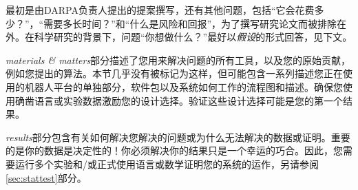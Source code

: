 
最初是由DARPA负责人提出的提案撰写，还有其他问题，包括“它会花费多少？”，“需要多长时间？”和“什么是风险和回报”，为了撰写研究论文而被排除在外。在科学研究的背景下，问题“你想做什么？”最好以\emph{假设}的形式回答，见下文。

\emph{materials \& matters}部分描述了您用来解决问题的所有工具，以及您的原始贡献，例如您提出的算法。本节几乎没有被标记为这样，但可能包含一系列描述您正在使用的机器人平台的单独部分，软件包以及系统如何工作的流程图和描述。确保您使用确凿语言或实验数据激励您的设计选择。验证这些设计选择可能是您的第一个结果。

\emph{results}部分包含有关如何解决您解决的问题或为什么无法解决的数据或证明。重要的是你的数据是决定性的！你必须解决你的结果只是一个幸运的巧合。因此，您需要运行多个实验和/或正式使用语言或数学证明您的系统的运作，另请参阅\ref{sec:stattest}部分。




